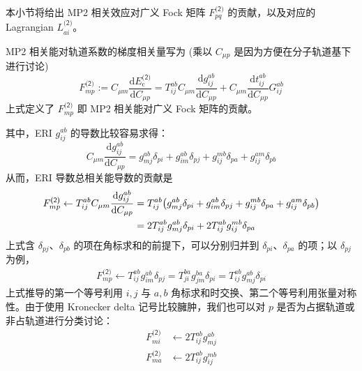 本小节将给出 MP2 相关效应对广义 Fock 矩阵 $F_{pq}^\textsf{(2)}$ 的贡献，以及对应的 Lagrangian $L_{ai}^\textsf{(2)}$。

MP2 相关能对轨道系数的梯度相关量写为 (乘以 $C_{\mu p}$ 是因为方便在分子轨道基下进行讨论)
\begin{equation}
  \label{eq.def-fock-cmp2}
  F_{mp}^\textsf{(2)} := C_{\mu m} \frac{\mathrm{d} E_\mathrm{c}^\textsf{(2)}}{\mathrm{d} C_{\mu p}} = T_{ij}^{ab} C_{\mu m} \frac{\mathrm{d} g_{ij}^{ab}}{\mathrm{d} C_{\mu p}} + C_{\mu m} \frac{\mathrm{d} t_{ij}^{ab}}{\mathrm{d} C_{\mu p}} G_{ij}^{ab}
\end{equation}
上式定义了 $F_{mp}^\textsf{(2)}$ 即 MP2 相关能对广义 Fock 矩阵的贡献。

其中，ERI $g_{ij}^{ab}$ 的导数比较容易求得：
\begin{equation}
  C_{\mu m} \frac{\mathrm{d} g_{ij}^{ab}}{\mathrm{d} C_{\mu p}} = g_{mj}^{ab} \delta_{pi} + g_{im}^{ab} \delta_{pj} + g_{ij}^{mb} \delta_{pa} + g_{ij}^{am} \delta_{pb}
\end{equation}
从而，ERI 导数总相关能导数的贡献是
\begin{align}
  F_{mp}^\textsf{(2)} \leftarrow T_{ij}^{ab} C_{\mu m} \frac{\mathrm{d} g_{ij}^{ab}}{\mathrm{d} C_{\mu p}} &= T_{ij}^{ab} \big( g_{mj}^{ab} \delta_{pi} + g_{im}^{ab} \delta_{pj} + g_{ij}^{mb} \delta_{pa} + g_{ij}^{am} \delta_{pb} \big) \notag\\
  &= 2 T_{ij}^{ab} g_{mj}^{ab} \delta_{pi} + 2 T_{ij}^{ab} g_{ij}^{mb} \delta_{pa}
\end{align}
上式含 $\delta_{pj}$、$\delta_{pb}$ 的项在角标求和的前提下，可以分别归并到 $\delta_{pi}$、$\delta_{pa}$ 的项；以 $\delta_{pj}$ 为例，
\begin{align*}
  F_{mp}^\textsf{(2)} \leftarrow T_{ij}^{ab} g_{im}^{ab} \delta_{pj} = T_{ji}^{ba} g_{jm}^{ba} \delta_{pi} = T_{ij}^{ab} g_{mj}^{ab} \delta_{pi}
\end{align*}
上式推导的第一个等号利用 $i, j$ 与 $a, b$ 角标求和时交换、第二个等号利用张量对称性。由于使用 Kronecker delta 记号比较臃肿，我们也可以对 $p$ 是否为占据轨道或非占轨道进行分类讨论：
\begin{align}
  \label{eq.fock-cmp2-part1-mi}
  F_{mi}^\textsf{(2)} &\leftarrow 2 T_{ij}^{ab} g_{mj}^{ab} \\
  \label{eq.fock-cmp2-part1-ma}
  F_{ma}^\textsf{(2)} &\leftarrow 2 T_{ij}^{ab} g_{ij}^{mb}
\end{align}


